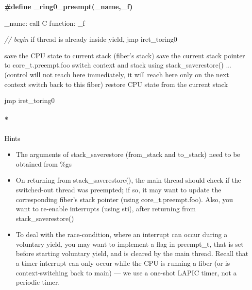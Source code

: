 \documentclass[]{article}
\newenvironment{Shaded}{}{}
\newcommand{\CommentTok}[1]{\textcolor[rgb]{0.50,0.50,0.50}{\textit{{#1}}}}
\newcommand{\ControlFlowTok}[1]{{#1}}
\newcommand{\PreprocessorTok}[1]{\textbf{{#1}}}
\newcommand{\NormalTok}[1]{{#1}}
\providecommand{\tightlist}{%
  \setlength{\itemsep}{0pt}\setlength{\parskip}{0pt}}
\let\oldparagraph\paragraph
\renewcommand{\paragraph}[1]{\oldparagraph{#1}\mbox{}}
\begin{document}
\begin{Shaded}
\begin{Highlighting}[]

   \PreprocessorTok{#define _ring0_preempt(_name,_f)}

   \NormalTok{_name:}
         \NormalTok{call C function: _f}

         \CommentTok{// begin}
         \ControlFlowTok{if} \NormalTok{thread is already inside yield,}
           \NormalTok{jmp iret_toring0}

         \NormalTok{save the CPU state to current stack (fiber's stack)}
         \NormalTok{save the current stack pointer to core_t.preempt.foo}
         \ControlFlowTok{switch} \NormalTok{context and stack using stack_saverestore()}
         \NormalTok{... (control will not reach here immediately, it will reach here only on the next context }\ControlFlowTok{switch} \NormalTok{back to this fiber)}
         \NormalTok{restore CPU state from the current stack}

         \NormalTok{jmp iret_toring0}
\end{Highlighting}
\end{Shaded}

\paragraph*{Hints}\label{hints}

\begin{itemize}
\tightlist
\item
  The arguments of stack\_saverestore (from\_stack and to\_stack) need
  to be obtained from \%gs
\item
  On returning from stack\_saverestore(), the main thread should check
  if the switched-out thread was preempted; if so, it may want to update
  the corresponding fiber's stack pointer (using core\_t.preempt.foo).
  Also, you want to re-enable interrupts (using sti), after returning
  from stack\_saverestore()
\item
  To deal with the race-condition, where an interrupt can occur during a
  voluntary yield, you may want to implement a flag in preempt\_t, that
  is set before starting voluntary yield, and is cleared by the main
  thread. Recall that a timer interrupt can only occur while the CPU is
  running a fiber (or is context-switching back to main) --- we use a
  one-shot LAPIC timer, not a periodic timer.
\end{itemize}
\end{document}
